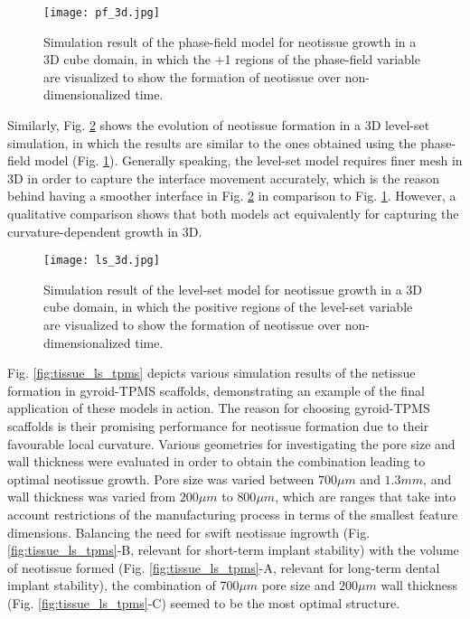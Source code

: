 \begin{figure}
\centering
\medskip
\texttt{[image: pf\_3d.jpg]}
\caption[Simulation result of the phase-field model for neotissue growth in a 3D cube domain]{Simulation result of the phase-field model for neotissue growth in a 3D cube domain, in which the +1 regions of the phase-field variable are visualized to show the formation of neotissue over non-dimensionalized time.}
\label{fig:tissue_pf_3d}
\end{figure}

Similarly, Fig. \ref{fig:tissue_ls_3d} shows the evolution of neotissue formation in a 3D level-set simulation, in which the results are similar to the ones obtained using the phase-field model (Fig. \ref{fig:tissue_pf_3d}). Generally speaking, the level-set model requires finer mesh in 3D in order to capture the interface movement accurately, which is the reason behind having a smoother interface in Fig. \ref{fig:tissue_ls_3d} in comparison to Fig. \ref{fig:tissue_pf_3d}. However, a qualitative comparison shows that both models act equivalently for capturing the curvature-dependent growth in 3D.

\begin{figure}
\centering
\medskip
\texttt{[image: ls\_3d.jpg]}
\caption[Simulation result of the level-set model for neotissue growth in a 3D cube domain]{Simulation result of the level-set model for neotissue growth in a 3D cube domain, in which the positive regions of the level-set variable are visualized to show the formation of neotissue over non-dimensionalized time.}
\label{fig:tissue_ls_3d}
\end{figure}

Fig. \ref{fig:tissue_ls_tpms} depicts various simulation results of the netissue formation in gyroid-\gls{TPMS} scaffolds, demonstrating an example of the final application of these models in action. The reason for choosing gyroid-\gls{TPMS} scaffolds is their promising performance for neotissue formation due to their favourable local curvature. Various geometries for investigating the pore size and wall thickness were evaluated in order to obtain the combination leading to optimal neotissue growth. Pore size was varied between $700  \mu m$ and $1.3 mm $, and wall thickness was varied from $200 \mu m $ to $800 \mu m$, which are ranges that take into account restrictions of the manufacturing process in terms of the smallest feature dimensions. Balancing the need for swift neotissue ingrowth (Fig. \ref{fig:tissue_ls_tpms}-B, relevant for short-term implant stability) with the volume of neotissue formed (Fig. \ref{fig:tissue_ls_tpms}-A, relevant for long-term dental implant stability), the combination of $700 \mu m$ pore size and $200 \mu m $ wall thickness (Fig. \ref{fig:tissue_ls_tpms}-C) seemed to be the most optimal structure.

